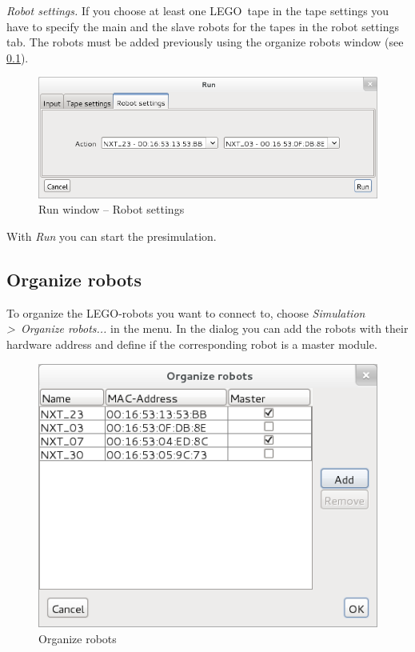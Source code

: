 \documentclass[%
  a4paper,%
  11pt,%
  blue,%
  hyperref	%
  ]{tubsartcl}
\begin{document}
\emph{Robot settings.} If you choose at least one LEGO\textregistered\, tape in the tape settings you have to specify the main and the slave robots for the tapes in the robot settings tab. The robots must be added previously using the organize robots window (see \ref{sec:organize-robots}).

\begin{figure}[!htb]
\begin{center}
\includegraphics[scale=0.5]{graphics_gui/run_window_robot_settings.png}
\end{center}
\caption{Run window -- Robot settings}
\label{pic:run_window_robot_settings}
\end{figure}
 
With \emph{Run} you can start the presimulation.

\subsection{Organize robots}
\label{sec:organize-robots}

To organize the LEGO-robots you want to connect to, choose \emph{Simulation \textgreater\ Organize robots...} in the menu. In the dialog you can add the robots with their hardware address and define if the corresponding robot is a master module.
\begin{figure}[!htb]
\begin{center}
\includegraphics[scale=0.45]{graphics_gui/organize_robots.png}
\end{center}
\caption{Organize robots}
\label{pic:organize_robots}
\end{figure}
\end{document}
